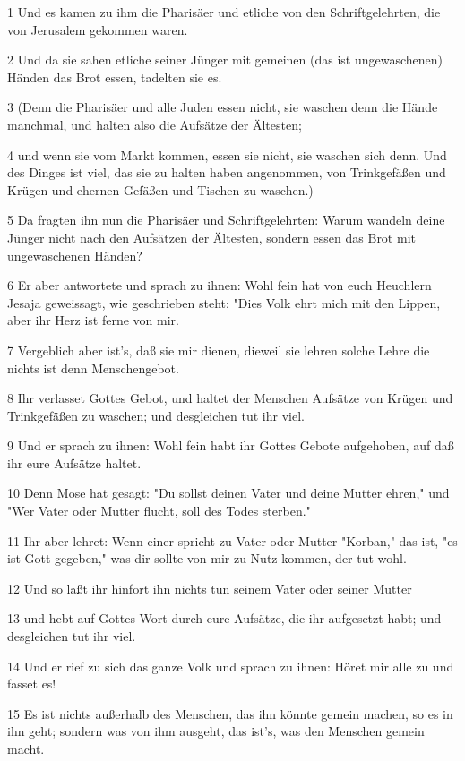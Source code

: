 \par 1 Und es kamen zu ihm die Pharisäer und etliche von den Schriftgelehrten, die von Jerusalem gekommen waren.
\par 2 Und da sie sahen etliche seiner Jünger mit gemeinen (das ist ungewaschenen) Händen das Brot essen, tadelten sie es.
\par 3 (Denn die Pharisäer und alle Juden essen nicht, sie waschen denn die Hände manchmal, und halten also die Aufsätze der Ältesten;
\par 4 und wenn sie vom Markt kommen, essen sie nicht, sie waschen sich denn. Und des Dinges ist viel, das sie zu halten haben angenommen, von Trinkgefäßen und Krügen und ehernen Gefäßen und Tischen zu waschen.)
\par 5 Da fragten ihn nun die Pharisäer und Schriftgelehrten: Warum wandeln deine Jünger nicht nach den Aufsätzen der Ältesten, sondern essen das Brot mit ungewaschenen Händen?
\par 6 Er aber antwortete und sprach zu ihnen: Wohl fein hat von euch Heuchlern Jesaja geweissagt, wie geschrieben steht: "Dies Volk ehrt mich mit den Lippen, aber ihr Herz ist ferne von mir.
\par 7 Vergeblich aber ist's, daß sie mir dienen, dieweil sie lehren solche Lehre die nichts ist denn Menschengebot.
\par 8 Ihr verlasset Gottes Gebot, und haltet der Menschen Aufsätze von Krügen und Trinkgefäßen zu waschen; und desgleichen tut ihr viel.
\par 9 Und er sprach zu ihnen: Wohl fein habt ihr Gottes Gebote aufgehoben, auf daß ihr eure Aufsätze haltet.
\par 10 Denn Mose hat gesagt: "Du sollst deinen Vater und deine Mutter ehren," und "Wer Vater oder Mutter flucht, soll des Todes sterben."
\par 11 Ihr aber lehret: Wenn einer spricht zu Vater oder Mutter "Korban," das ist, "es ist Gott gegeben," was dir sollte von mir zu Nutz kommen, der tut wohl.
\par 12 Und so laßt ihr hinfort ihn nichts tun seinem Vater oder seiner Mutter
\par 13 und hebt auf Gottes Wort durch eure Aufsätze, die ihr aufgesetzt habt; und desgleichen tut ihr viel.
\par 14 Und er rief zu sich das ganze Volk und sprach zu ihnen: Höret mir alle zu und fasset es!
\par 15 Es ist nichts außerhalb des Menschen, das ihn könnte gemein machen, so es in ihn geht; sondern was von ihm ausgeht, das ist's, was den Menschen gemein macht.
